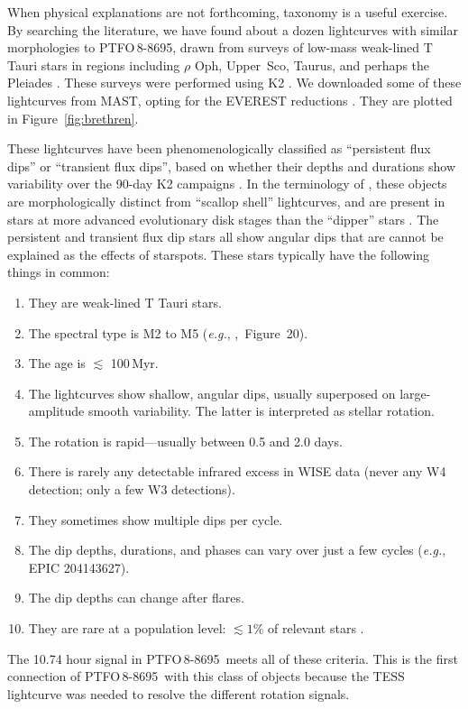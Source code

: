 \documentclass[12pt,twocolumn,tighten]{aastex62}
\newcommand{\ptfo}{PTFO$\,$8-8695}
\begin{document}
When physical explanations are not forthcoming, taxonomy is a
useful exercise.  By searching the literature, we have found about a dozen lightcurves with
similar morphologies to \ptfo, drawn from surveys of low-mass weak-lined
T Tauri stars in regions including $\rho$ Oph, Upper~Sco, Taurus, and
perhaps the Pleiades
\citep{rebull_rotation_2016,david_transient_2017,stauffer_orbiting_2017,stauffer_rotevol_2018,rebull_usco_2018,rebull_rotation_2020}.
These surveys were performed using K2 \citep{howell_k2_2014}.  We
downloaded some of these lightcurves from MAST, opting for the
EVEREST reductions \citep{luger_everest_2016,luger_update_2018}.
They are plotted in Figure~\ref{fig:brethren}.

These lightcurves have been phenomenologically classified as
``persistent flux dips'' or ``transient flux dips'', based on whether
their depths and durations show variability over the 90-day K2
campaigns \citep{stauffer_orbiting_2017}.
In the terminology of \citet{stauffer_orbiting_2017},
these objects are morphologically distinct from ``scallop shell'' lightcurves,
and are present in stars at more advanced evolutionary disk stages than
the ``dipper'' stars \citep{ansdell_young_2016,cody_manyfaceted_2018}.
The persistent and transient flux dip stars all show angular dips
that are cannot be explained as the effects of starspots.
These stars typically have the following things in common:
\begin{enumerate}[topsep=0.5ex,itemsep=-0.5ex,partopsep=1ex,parsep=1.5ex]
  \item They are weak-lined T Tauri stars.
  \item The spectral type is M2 to M5 ({\it e.g.},
    \citealt{rebull_usco_2018},~Figure~20).
  \item The age is $\lesssim$ 100$\,$Myr.
  \item The lightcurves show shallow, angular dips, usually
    superposed on large-amplitude smooth variability. The latter
    is interpreted as stellar rotation.
  \item The rotation is rapid---usually between 0.5 and 2.0 days.
  \item There is rarely any detectable infrared excess in WISE data
  (never any W4 detection; only a few W3 detections).
  \item They sometimes show multiple dips per cycle.
  \item The dip depths, durations, and phases can vary over just a few cycles
    ({\it e.g.}, EPIC 204143627).
  \item The dip depths can change after flares.
  \item They are rare at a population level: $\lesssim 1\%$ of relevant stars
    \citep{rebull_usco_2018}.
\end{enumerate}
The 10.74 hour signal in \ptfo\ meets all of these criteria.
This is the first connection of \ptfo\ with this class of objects
because the TESS lightcurve was needed to resolve the different
rotation signals.
\end{document}
